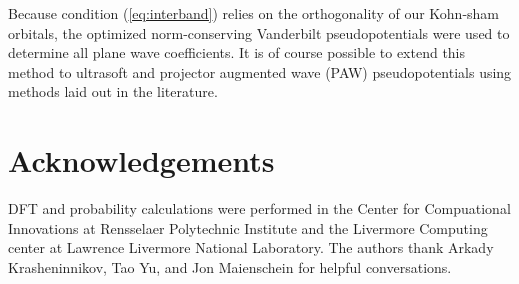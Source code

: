 \documentclass{article}
\begin{document}
Because condition (\ref{eq:interband}) relies on the orthogonality of our Kohn-sham orbitals, the optimized norm-conserving Vanderbilt pseudopotentials\cite{Hamann2013, Schlipf2015} were used to determine all plane wave coefficients.  It is of course possible to extend this method to ultrasoft and projector augmented wave (PAW) \cite{Blochl1994} pseudopotentials using methods laid out in the literature\cite{Shishkin2006a, Gajdos2006, Paier2005}.

\section{Acknowledgements}
DFT and probability calculations were performed in the Center for Compuational
Innovations at Rensselaer Polytechnic Institute and the Livermore Computing
center at Lawrence Livermore National Laboratory.
The authors thank Arkady Krasheninnikov, Tao Yu, and Jon Maienschein for helpful conversations.

\printbibliography
\end{document}

